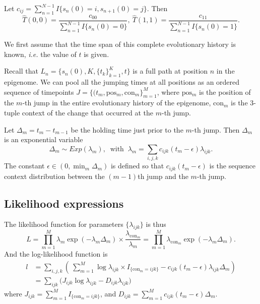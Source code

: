\documentclass[11pt]{article}
\newcommand{\context}{\ensuremath{\mathrm{con}}}
\newcommand{\psn}{\ensuremath{\mathrm{pos}}}
\begin{document}
Let $c_{ij} = \sum_{n=1}^{N-1}I\{s_n(0) =i, s_{n+1}(0)=j\}$. Then
\[
\hat{T}(0, 0) = \frac{c_{00}}{\sum_{n=1}^{N-1}I\{s_n(0) = 0\}}, ~
\hat{T}(1,1) = \frac{c_{11}}{\sum_{n=1}^{N-1}I\{s_n(0) = 1\}}.
\]

We first assume that the time span of this complete evolutionary
history is known, \textit{i.e.} the value of $t$ is given.

Recall that $L_n = \{s_n(0), K, \{t_k\}_{k=1}^K, t\}$ is a full path
at position $n$ in the epigenome. We can pool all the jumping times at
all positions as an ordered sequence of timepoints $J = \{(t_m, \psn{}_m,
\context{}_m\}_{m=1}^{M}$, where $\psn{}_m$ is the position of the
$m$-th jump in the entire evolutionary history of the epigenome,
$\context{}_m$ is the 3-tuple context of the change that
occurred at the $m$-th jump.

Let $\Delta_m = t_m - t_{m-1}$ be the holding time just prior to the
$m$-th jump. Then $\Delta_m$ is an exponential variable
\[
\Delta_m \sim \mathit{Exp}(\lambda_m), ~\text{ with }~
\lambda_m = \sum_{i,j,k}c_{ijk}(t_m - \epsilon)\lambda_{ijk}.
\]
The constant $\epsilon \in (0, \textstyle\min_m \Delta_{m})$ is
defined so that $c_{ijk}(t_m - \epsilon)$ is the sequence context
distribution between the $(m-1)$th jump and the $m$-th jump.

\subsection{Likelihood expressions}

The likelihood function for parameters $\{\lambda_{ijk}\}$ is thus
\begin{equation}\label{eqn:lik}
L = \prod\limits_{m=1}^{M} \lambda_m \exp(-\lambda_m\Delta_m) \times \frac{\lambda_{\context{}_m}}{\lambda_m}
=\prod\limits_{m=1}^{M}\lambda_{\context{}_m}\exp(-\lambda_m\Delta_m).
\end{equation}
And the log-likelihood function is
\begin{equation}\label{eqn:loglik1}
\begin{aligned}
l & = \sum_{i,j,k} \left(~
\sum_{m=1}^M\log\lambda_{ijk}\times I_{\{\context{}_m = ijk\}} - c_{ijk}(t_m-\epsilon)\lambda_{ijk}\Delta_m\right) \\
& = \sum\limits_{ijk} \big(J_{ijk}\log\lambda_{ijk} - D_{ijk}\lambda_{ijk} \big)
\end{aligned}
\end{equation}
where $J_{ijk} = \sum_{m=1}^M I_{\{\context{}_m = ijk\}}$, and $D_{ijk} = \sum_{m=1}^Mc_{ijk}(t_m-\epsilon)\Delta_m$.
\end{document}

